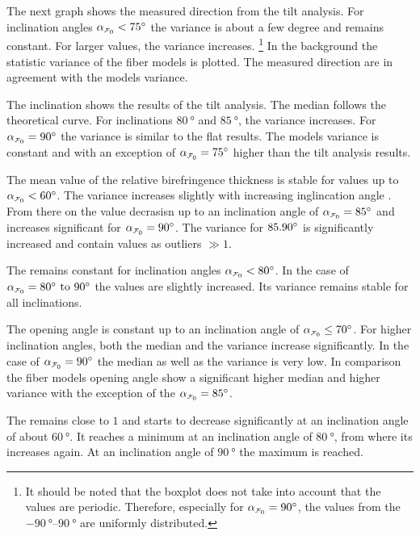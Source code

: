 \par
% 
The next graph shows the measured direction from the tilt analysis.
For inclination angles $\modelInc<\SI{75}{\degree}$ the variance is about a few degree and remains constant.
For larger values, the variance increases.
\footnote{It should be noted that the boxplot does not take into account that the values are periodic.
Therefore, especially for $\modelInc=\SI{90}{\degree}$, the values from the $\SIrange{-90}{90}{\degree}$ are uniformly distributed.}
In the background the statistic \bvariance{} variance of the fiber models is plotted.
The measured direction are in agreement with the models variance.
\par
%
The inclination shows the results of the tilt analysis.
The median follows the theoretical curve.
For inclinations $\SI{80}{\degree}$ and $\SI{85}{\degree}$, the variance increases.
For $\modelInc = \SI{90}{\degree}$ the variance is similar to the flat results.
The models \bvariance{} variance is constant and with an exception of $\modelInc=\SI{75}{\degree}$ higher than the tilt analysis results.
\par
%
The mean value of the relative birefringence thickness \trel{} is stable for values up to $\modelInc < \SI{60}{\degree}$.
The variance increases slightly with increasing inglincation angle \modelInc{}.
From there on the \trel{} value decrasisn up to an inclination angle of $\modelInc=\SI{85}{\degree}$ and increases significant for $\modelInc = \SI{90}{\degree}$.
The variance for $\SIlist{85,90}{\degree}$ is significantly increased and contain values as outliers $\gg 1$.
\par
% 
The \rvalue{} remains constant for inclination angles $\modelInc < \SI{80}{\degree}$.
In the case of $\modelInc=\SIrange[]{80}{90}{\degree}$ the values are slightly increased.
Its variance remains stable for all inclinations.
\par
%
The opening angle \openingAngle{} is constant up to an inclination angle of $\modelInc \le \SI{70}{\degree}$.
For higher inclination angles, both the median and the variance increase significantly.
In the case of $\modelInc = \SI{90}{\degree}$ the median as well as the variance is very low.
In comparison the fiber models opening angle \openingAngle{} show a significant higher median and higher \bvariance{} variance with the exception of the $\modelInc=\SI{85}{\degree}$.
\par
% 
The \accvalue{} remains close to $1$ and starts to decrease significantly at an inclination angle of about $\SI{60}{\degree}$.
It reaches a minimum at an inclination angle of $\SI{80}{\degree}$, from where its increases again.
At an inclination angle of $\SI{90}{\degree}$ the maximum \accvalue{} is reached.
%
%
%
